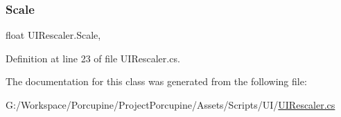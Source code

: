 \subsubsection{\texorpdfstring{Scale}{Scale}}
{\footnotesize\ttfamily float U\+I\+Rescaler.\+Scale\hspace{0.3cm}{\ttfamily [get]}, {\ttfamily [set]}}



Definition at line 23 of file U\+I\+Rescaler.\+cs.



The documentation for this class was generated from the following file\+:\begin{DoxyCompactItemize}
\item 
G\+:/\+Workspace/\+Porcupine/\+Project\+Porcupine/\+Assets/\+Scripts/\+U\+I/\hyperlink{_u_i_rescaler_8cs}{U\+I\+Rescaler.\+cs}\end{DoxyCompactItemize}
